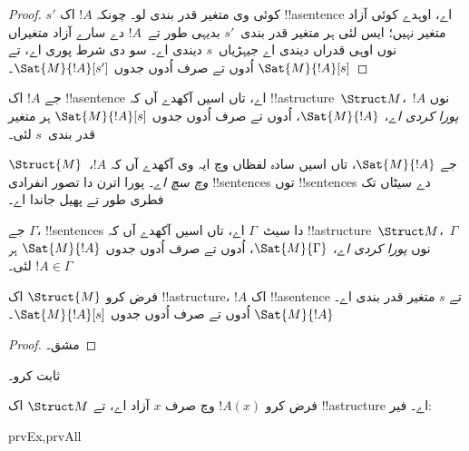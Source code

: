 \documentclass[../../../include/open-logic-section]{subfiles}
\begin{document}
\begin{proof}
  $s'$ کوئی وی متغیر قدر بندی لو۔ چونکہ $!A$ اک !!a{sentence} اے،
  اوہدے کوئی آزاد متغیر نہیں؛ ایس لئی ہر متغیر قدر بندی~$s'$
  بدیہی طور تے~$!A$ دے سارے آزاد متغیراں نوں اوہی قدراں دیندی
  اے جیہڑیاں~$s$ دیندی اے۔ سو  دی شرط پوری
  اے، تے $\Sat{M}{!A}[s]$ اُدوں تے صرف اُدوں جدوں
  $\Sat{M}{!A}[s']$۔
\end{proof}

\begin{defn}
جے $!A$ اک !!a{sentence} اے، تاں اسیں آکھدے آں کہ
!!a{structure}~$\Struct M$،~$!A$ نوں \emph{پورا کردی اے}،
$\Sat{M}{!A}$، اُدوں تے صرف اُدوں جدوں
$\Sat{M}{!A}[s]$ ہر متغیر قدر بندی~$s$ لئی۔
\end{defn}

جے $\Sat{M}{!A}$، تاں اسیں سادہ لفظاں وچ ایہ وی آکھدے آں کہ
\emph{$!A$،~$\Struct{M}$ وچ سچ اے۔} پورا اترن دا تصور
انفرادی !!{sentence}s توں !!{sentence}s دے سیٹاں تک فطری طور تے
پھیل جاندا اے۔

\begin{defn}
جے $\Gamma$، !!{sentence}s دا سیٹ~$\Gamma$ اے، تاں اسیں
آکھدے آں کہ !!a{structure}~$\Struct M$،~$\Gamma$ نوں
\emph{پورا کردی اے}، $\Sat{M}{\Gamma}$، اُدوں تے صرف اُدوں
جدوں $\Sat{M}{!A}$ ہر $!A \in \Gamma$ لئی۔
\end{defn}

\begin{prop}
  فرض کرو $\Struct{M}$ اک !!a{structure}، $!A$ اک
  !!a{sentence} تے $s$ متغیر قدر بندی اے۔ $\Sat{M}{!A}$
  اُدوں تے صرف اُدوں جدوں $\Sat{M}{!A}[s]$۔
\end{prop}

\begin{proof}
مشق۔
\end{proof}

\begin{prob}
 ثابت کرو۔
\end{prob}

\begin{prop}
  فرض کرو $!A(x)$ وچ صرف $x$ آزاد اے، تے $\Struct M$ اک
  !!a{structure} اے۔ فیر:
  \begin{tagenumerate}{prvEx,prvAll}
\end{tagenumerate}
\end{prop}
\end{document}

